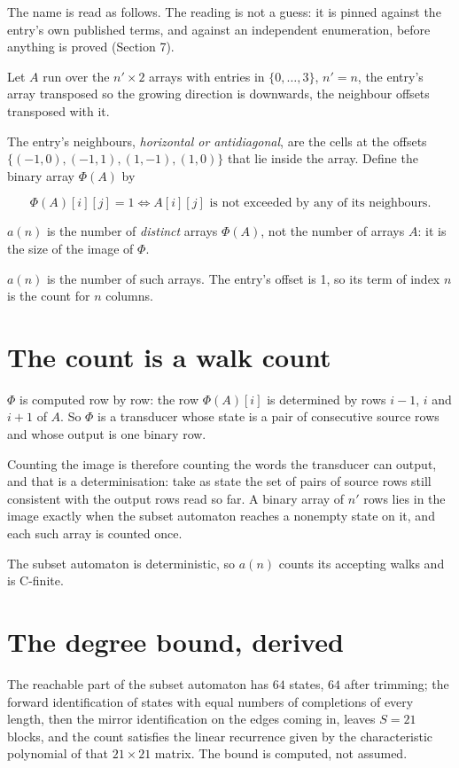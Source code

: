 \documentclass[11pt]{article}
\theoremstyle{definition}
\begin{document}
The name is read as follows. The reading is not a guess: it is pinned against the entry's own published terms, and against an independent enumeration, before anything is proved (Section 7).

Let $A$ run over the $n' \times 2$ arrays with entries in $\{0,\dots,3\}$, $n' = n$, the entry's array transposed so the growing direction is downwards, the neighbour offsets transposed with it.

The entry's neighbours, {\itshape horizontal or antidiagonal}, are the cells at the offsets $\{(-1,0), (-1,1), (1,-1), (1,0)\}$ that lie inside the array. Define the binary array $\Phi(A)$ by

\[\Phi(A)[i][j] = 1 \iff A[i][j] \text{ is not exceeded by any of its neighbours}.\]

$a(n)$ is the number of {\itshape distinct} arrays $\Phi(A)$, not the number of arrays $A$: it is the size of the image of $\Phi$.

$a(n)$ is the number of such arrays. The entry's offset is 1, so its term of index $n$ is the count for $n$ columns.

\section{The count is a walk count}

$\Phi$ is computed row by row: the row $\Phi(A)[i]$ is determined by rows $i-1$, $i$ and $i+1$ of $A$. So $\Phi$ is a transducer whose state is a pair of consecutive source rows and whose output is one binary row.

Counting the image is therefore counting the words the transducer can output, and that is a determinisation: take as state the set of pairs of source rows still consistent with the output rows read so far. A binary array of $n'$ rows lies in the image exactly when the subset automaton reaches a nonempty state on it, and each such array is counted once.

The subset automaton is deterministic, so $a(n)$ counts its accepting walks and is C-finite.

\section{The degree bound, derived}

The reachable part of the subset automaton has $64$ states, $64$ after trimming; the forward identification of states with equal numbers of completions of every length, then the mirror identification on the edges coming in, leaves $S = 21$ blocks, and the count satisfies the linear recurrence given by the characteristic polynomial of that $21\times21$ matrix. The bound is computed, not assumed.
\end{document}
